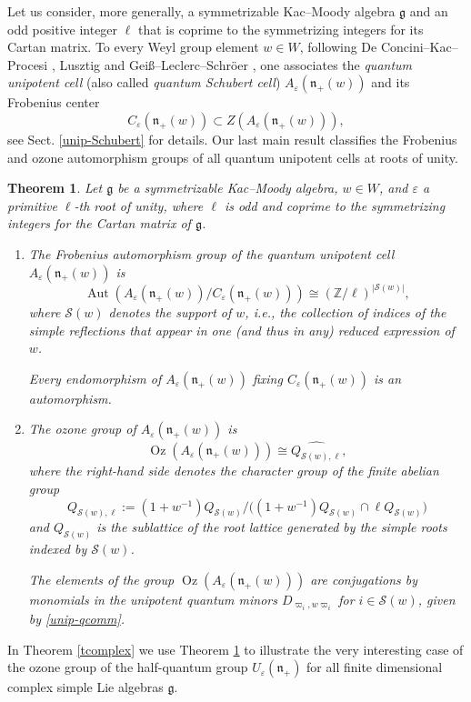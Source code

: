 \documentclass[11pt]{amsart}
\theoremstyle{plain}
\newcommand \thref[1]{Theorem \ref{t#1}}
\newtheorem{thmintro}{Theorem}
\def \Zset {{\mathbb Z}}
\def \SS {{\mathcal{S}}}
\def \vpi {\varpi}
\def \ep {\varepsilon}
\def \wh {\widehat}
\def \g  {\mathfrak{g}}   %
\def \n  {\mathfrak{n}}
\DeclareMathOperator \Aut { {\mathrm{Aut}} }
\DeclareMathOperator \Oz { {\mathrm{Oz}}}
\begin{document}
Let us consider, more generally, a symmetrizable Kac--Moody algebra $\g$ and an odd positive integer $\ell$ 
that is coprime to the symmetrizing integers for its Cartan matrix. To every Weyl group element $w \in W$, 
following De Concini--Kac--Procesi \cite{DKP95}, Lusztig \cite{Lus93} and Gei\ss--Leclerc--Schr\"oer \cite{GLS}, one associates the 
{\em{quantum unipotent cell}} (also called {\em{quantum Schubert cell}}) $A_\ep(\n_+(w))$ and its Frobenius center
\[
C_\ep(\n_+(w)) \subset Z(A_\ep(\n_+(w))), 
\]
see Sect. \ref{unip-Schubert} for details. 
Our last main result classifies the Frobenius and ozone automorphism groups of all quantum unipotent cells at roots of unity.

\begin{thmintro} 
\label{thmE}
Let $\g$ be a symmetrizable Kac--Moody algebra, $w \in W$, and $\ep$ a primitive $\ell$-th root of unity, where $\ell$ is odd and coprime to the symmetrizing integers for the Cartan matrix of $\g$. 
\begin{enumerate}
    \item[(i)] The Frobenius automorphism group of the quantum unipotent cell $A_\ep(\n_+(w))$ is  
\[
\Aut(A_\ep(\n_+(w))/C_\ep(\n_+(w))) \cong (\Zset/\ell)^{|\SS(w)|}, 
\]
where $\SS(w)$ denotes the support of $w$, i.e., the collection of indices of the simple reflections that appear in one (and thus in any) reduced expression of $w$. 

Every endomorphism of $A_\ep(\n_+(w))$ fixing $C_\ep(\n_+(w))$ is an automorphism.
    \item[(ii)] The ozone group of $A_\ep(\n_+(w))$ is
\[
\Oz(A_\ep(\n_+(w))) \cong \wh{Q_{\SS(w), \ell}},
\]
where the right-hand side denotes the character group of the finite abelian group
\[
Q_{\SS(w),\ell}:=
(1+w^{-1})Q_{\SS(w)}/\big( (1+w^{-1})Q_{\SS(w)} \cap \ell Q_{\SS(w)} \big)
\]
and $Q_{\SS(w)}$ is the sublattice of the root lattice generated by the simple roots indexed by $\SS(w)$. 

The elements of the group $\Oz(A_\ep(\n_+(w)))$ are conjugations by monomials 
in the unipotent quantum minors $D_{\vpi_i, w \vpi_i}$ for $i \in \SS(w)$, 
given by \eqref{unip-qcomm}.
\end{enumerate}
\end{thmintro}

In \thref{complex} we use Theorem \ref{thmE} to illustrate the very interesting case of the ozone group of the half-quantum group $U_\ep(\n_+)$ for all finite dimensional complex simple Lie algebras $\g$.  
\end{document}

